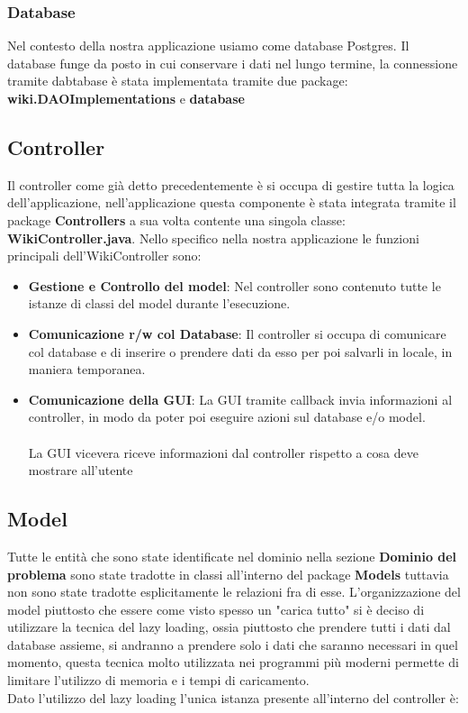 \documentclass{article}
\begin{document}
		\subsubsection{Database}
		Nel contesto della nostra applicazione usiamo come database Postgres. Il database funge da posto in cui conservare i dati nel lungo termine, la connessione tramite dabtabase \`e stata implementata tramite due package: \textbf{wiki.DAOImplementations} e \textbf{database}
		
		
	\subsection {Controller}
	Il controller come gi\`a detto precedentemente \`e si occupa di gestire tutta la logica dell'applicazione, nell'applicazione questa componente \`e stata integrata tramite il package \textbf{Controllers} a sua volta contente una singola classe: \textbf{WikiController.java}. Nello specifico nella nostra applicazione le funzioni principali dell'WikiController sono:
	
	\begin{itemize}
		\item \textbf{Gestione e Controllo del model}: Nel controller sono contenuto tutte le istanze di classi del model durante l'esecuzione.
		
		\item \textbf{Comunicazione r/w col Database}: Il controller si occupa di comunicare col database e di inserire o prendere dati da esso per poi salvarli in locale, in maniera temporanea.
		
		\item \textbf{Comunicazione della GUI}: La GUI tramite callback invia informazioni al controller, in modo da poter poi eseguire azioni sul database e/o model.
		\\\\
		La GUI vicevera riceve informazioni dal controller rispetto a cosa deve mostrare all'utente
	\end{itemize}
	
	
	\subsection{Model}
	Tutte le entit\`a che sono state identificate nel dominio nella sezione \textbf{Dominio del problema} sono state tradotte in classi all'interno del package \textbf{Models} tuttavia non sono state tradotte esplicitamente le relazioni fra di esse. L'organizzazione del model piuttosto che essere come visto spesso un "carica tutto" si \`e deciso di utilizzare la tecnica del lazy loading, ossia piuttosto che prendere tutti i dati dal database assieme, si andranno a prendere solo i dati che saranno necessari in quel momento, questa tecnica molto utilizzata nei programmi pi\`u moderni permette di limitare l'utilizzo di memoria e i tempi di caricamento.
	\\
	Dato l'utilizzo del lazy loading l'unica istanza presente all'interno del controller \`e:
	
\end{document}
